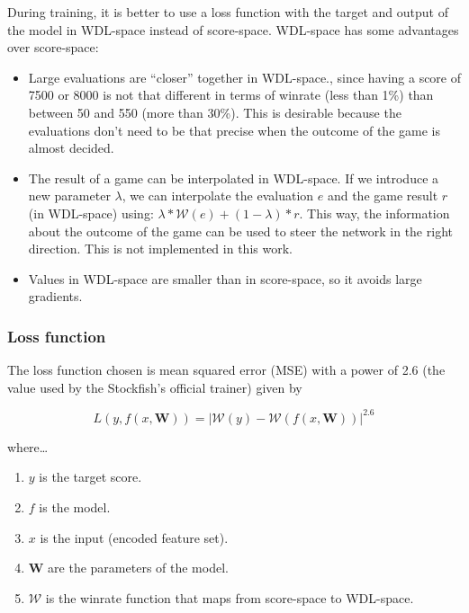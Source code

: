 During training, it is better to use a loss function with the target and output of the model in WDL-space instead of score-space. WDL-space has some advantages over score-space:

\begin{itemize}
\item Large evaluations are \enquote{closer} together in WDL-space., since having a score of 7500 or 8000 is not that different in terms of winrate (less than 1\%) than between 50 and 550 (more than 30\%). This is desirable because the evaluations don't need to be that precise when the outcome of the game is almost decided.
\item The result of a game can be interpolated in WDL-space. If we introduce a new parameter $\lambda$, we can interpolate the evaluation $e$ and the game result $r$ (in WDL-space) using: $\lambda * \mathcal{W}(e) + (1 - \lambda) * r$. This way, the information about the outcome of the game can be used to steer the network in the right direction. This is not implemented in this work.
\item Values in WDL-space are smaller than in score-space, so it avoids large gradients.
\end{itemize}




\subsubsection{Loss function}

The loss function chosen is mean squared error (MSE) with a power of 2.6 (the value used by the Stockfish's official trainer) given by


\[
L(y,f(x,\bm{W}))= \left| \mathcal{W}(y) - \mathcal{W}(f(x,\bm{W})) \right| ^{2.6}
\]


where\dots

\begin{enumerate}
\itemsep0em
\item $y$ is the target score.
\item $f$ is the model.
\item $x$ is the input (encoded feature set).
\item $\bm{W}$ are the parameters of the model.
\item $\mathcal{W}$ is the winrate function that maps from score-space to WDL-space.
\end{enumerate}

